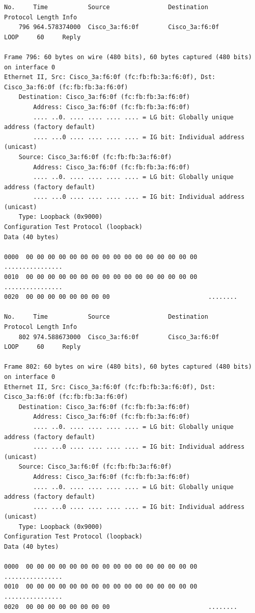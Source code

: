 \documentclass[a4paper,11pt]{article}
\begin{document}
\begin{lstlisting}
No.     Time           Source                Destination           Protocol Length Info
    796 964.578374000  Cisco_3a:f6:0f        Cisco_3a:f6:0f        LOOP     60     Reply

Frame 796: 60 bytes on wire (480 bits), 60 bytes captured (480 bits) on interface 0
Ethernet II, Src: Cisco_3a:f6:0f (fc:fb:fb:3a:f6:0f), Dst: Cisco_3a:f6:0f (fc:fb:fb:3a:f6:0f)
    Destination: Cisco_3a:f6:0f (fc:fb:fb:3a:f6:0f)
        Address: Cisco_3a:f6:0f (fc:fb:fb:3a:f6:0f)
        .... ..0. .... .... .... .... = LG bit: Globally unique address (factory default)
        .... ...0 .... .... .... .... = IG bit: Individual address (unicast)
    Source: Cisco_3a:f6:0f (fc:fb:fb:3a:f6:0f)
        Address: Cisco_3a:f6:0f (fc:fb:fb:3a:f6:0f)
        .... ..0. .... .... .... .... = LG bit: Globally unique address (factory default)
        .... ...0 .... .... .... .... = IG bit: Individual address (unicast)
    Type: Loopback (0x9000)
Configuration Test Protocol (loopback)
Data (40 bytes)

0000  00 00 00 00 00 00 00 00 00 00 00 00 00 00 00 00   ................
0010  00 00 00 00 00 00 00 00 00 00 00 00 00 00 00 00   ................
0020  00 00 00 00 00 00 00 00                           ........

No.     Time           Source                Destination           Protocol Length Info
    802 974.588673000  Cisco_3a:f6:0f        Cisco_3a:f6:0f        LOOP     60     Reply

Frame 802: 60 bytes on wire (480 bits), 60 bytes captured (480 bits) on interface 0
Ethernet II, Src: Cisco_3a:f6:0f (fc:fb:fb:3a:f6:0f), Dst: Cisco_3a:f6:0f (fc:fb:fb:3a:f6:0f)
    Destination: Cisco_3a:f6:0f (fc:fb:fb:3a:f6:0f)
        Address: Cisco_3a:f6:0f (fc:fb:fb:3a:f6:0f)
        .... ..0. .... .... .... .... = LG bit: Globally unique address (factory default)
        .... ...0 .... .... .... .... = IG bit: Individual address (unicast)
    Source: Cisco_3a:f6:0f (fc:fb:fb:3a:f6:0f)
        Address: Cisco_3a:f6:0f (fc:fb:fb:3a:f6:0f)
        .... ..0. .... .... .... .... = LG bit: Globally unique address (factory default)
        .... ...0 .... .... .... .... = IG bit: Individual address (unicast)
    Type: Loopback (0x9000)
Configuration Test Protocol (loopback)
Data (40 bytes)

0000  00 00 00 00 00 00 00 00 00 00 00 00 00 00 00 00   ................
0010  00 00 00 00 00 00 00 00 00 00 00 00 00 00 00 00   ................
0020  00 00 00 00 00 00 00 00                           ........


\end{lstlisting}
\end{document}
